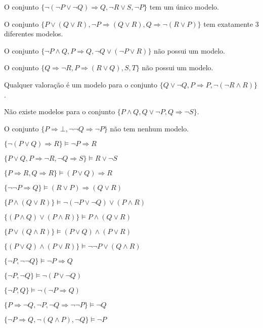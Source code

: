 \begin{exerList}
  \item O conjunto $\{\neg (\neg P \lor \neg Q) \Rightarrow Q, \neg R \lor S, \neg P \}$ tem um único modelo.
  \item O conjunto $\{P \lor (Q \lor R), \neg P \Rightarrow (Q \lor R), Q \Rightarrow \neg(R \lor P)\}$ tem exatamente 3 diferentes modelos.
  \item O conjunto $\{\neg P \land Q, P \Rightarrow Q, \neg Q \lor (\neg P \lor R)\}$ não possui um modelo.
  \item O conjunto $\{Q \Rightarrow \neg R, P \Rightarrow (R \lor Q), S, T\}$ não possui um modelo.
  \item Qualquer valoração é um modelo para o conjunto $\{Q \lor \neg Q, P \Rightarrow P, \neg (\neg R \land R)\}$.
  \item Não existe modelos para o conjunto $\{P \land Q, Q \lor \neg P, Q \Rightarrow \neg S\}$.
  \item O conjunto $\{P \Rightarrow \bot, \neg \neg Q \Rightarrow \neg P\}$ não tem nenhum modelo.
  \item $\{\neg (P \lor Q) \Rightarrow R\} \vDash \neg P \Rightarrow R$
  \item $\{P \lor Q, P \Rightarrow \neg R, \neg Q \Rightarrow S\} \vDash R \lor \neg S$
  \item $\{P \Rightarrow R, Q \Rightarrow R\} \vDash (P \lor Q) \Rightarrow R$
  \item $\{\neg \neg P \Rightarrow Q\} \vDash (R \lor P) \Rightarrow (Q \lor R)$
  \item $\{P \land (Q \lor R)\} \vDash \neg (\neg P \lor \neg Q) \lor (P \land R)$
  \item $\{(P \land Q) \lor (P \land R)\} \vDash P \land (Q \lor R)$
  \item $\{P \lor (Q \land R)\} \vDash (P \lor Q) \land (P \lor R)$
  \item $\{(P \lor Q) \land (P \lor R)\} \vDash \neg \neg P \lor (Q \land R)$
  \item $\{\neg P, \neg \neg Q\} \vDash \neg P \Rightarrow Q$
  \item $\{\neg P, \neg Q\} \vDash \neg (P \lor \neg Q)$
  \item $\{\neg P, Q\} \vDash \neg (\neg P \Rightarrow Q)$
  \item $\{P \Rightarrow \neg Q, \neg P, \neg Q \Rightarrow \neg \neg P\} \vDash \neg Q$
  \item $\{\neg P \Rightarrow Q, \neg (Q \land P),\neg Q\} \vDash \neg P$
\end{exerList}